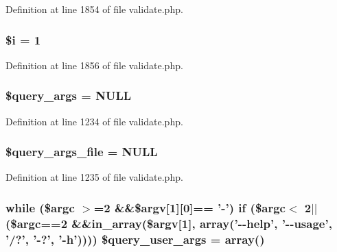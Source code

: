 Definition at line 1854 of file validate.\+php.

\hypertarget{validate_8php_a83018d9153d17d91fbcf3bc10158d34f}{
\subsubsection[{\$i}]{\setlength{\rightskip}{0pt plus 5cm}\$i = 1}}\label{validate_8php_a83018d9153d17d91fbcf3bc10158d34f}


Definition at line 1856 of file validate.\+php.

\hypertarget{validate_8php_a7a7edb3be73e5594d8856ac68aecd5ca}{
\subsubsection[{\$query\+\_\+args}]{\setlength{\rightskip}{0pt plus 5cm}\$query\+\_\+args = N\+U\+L\+L}}\label{validate_8php_a7a7edb3be73e5594d8856ac68aecd5ca}


Definition at line 1234 of file validate.\+php.

\hypertarget{validate_8php_a809bf1b50077e0d0a61a22a9c29e45f2}{
\subsubsection[{\$query\+\_\+args\+\_\+file}]{\setlength{\rightskip}{0pt plus 5cm}\$query\+\_\+args\+\_\+file = N\+U\+L\+L}}\label{validate_8php_a809bf1b50077e0d0a61a22a9c29e45f2}


Definition at line 1235 of file validate.\+php.

\hypertarget{validate_8php_a71edb70aa44d79c211ac52816d93b852}{
\subsubsection[{\$query\+\_\+user\+\_\+args}]{\setlength{\rightskip}{0pt plus 5cm}while (\$argc $>$=2 \&\&\$argv\mbox{[}1\mbox{]}\mbox{[}0\mbox{]}== '-\/') {\bf if} (\$argc$<$ 2$\vert$$\vert$(\$argc==2 \&\&in\+\_\+array(\$argv\mbox{[}1\mbox{]}, array('-\/-\/help', '-\/-\/usage', '/?', '-\/?', '-\/h')))) \$query\+\_\+user\+\_\+args = array()}}\label{validate_8php_a71edb70aa44d79c211ac52816d93b852}


